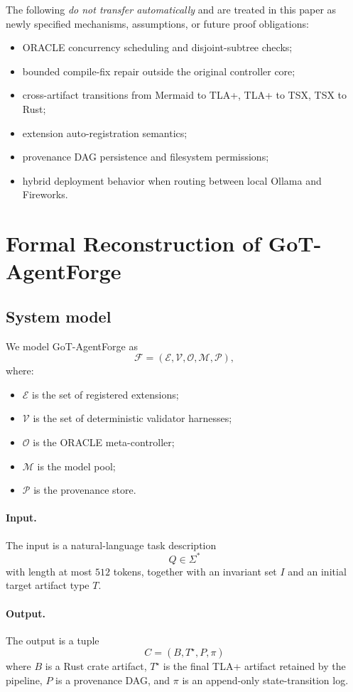 \documentclass[11pt,a4paper,oneside]{article}
\begin{document}
The following \emph{do not transfer automatically} and are treated in this paper as newly specified mechanisms, assumptions, or future proof obligations:
\begin{itemize}[leftmargin=2em]
    \item ORACLE concurrency scheduling and disjoint-subtree checks;
    \item bounded compile-fix repair outside the original controller core;
    \item cross-artifact transitions from Mermaid to TLA+, TLA+ to TSX, TSX to Rust;
    \item extension auto-registration semantics;
    \item provenance DAG persistence and filesystem permissions;
    \item hybrid deployment behavior when routing between local Ollama and Fireworks.
\end{itemize}

\section{Formal Reconstruction of GoT-AgentForge}
\subsection{System model}
We model GoT-AgentForge as
\[
\mathcal{F}=(\mathcal{E},\mathcal{V},\mathcal{O},\mathcal{M},\mathcal{P}),
\]
where:
\begin{itemize}[leftmargin=2em]
    \item $\mathcal{E}$ is the set of registered extensions;
    \item $\mathcal{V}$ is the set of deterministic validator harnesses;
    \item $\mathcal{O}$ is the ORACLE meta-controller;
    \item $\mathcal{M}$ is the model pool;
    \item $\mathcal{P}$ is the provenance store.
\end{itemize}

\paragraph{Input.}
The input is a natural-language task description
\[
Q \in \Sigma^*
\]
with length at most $512$ tokens, together with an invariant set $I$ and an initial target artifact type $T$.

\paragraph{Output.}
The output is a tuple
\[
C=(B,T^\star,P,\pi)
\]
where $B$ is a Rust crate artifact, $T^\star$ is the final TLA+ artifact retained by the pipeline, $P$ is a provenance DAG, and $\pi$ is an append-only state-transition log.
\end{document}
